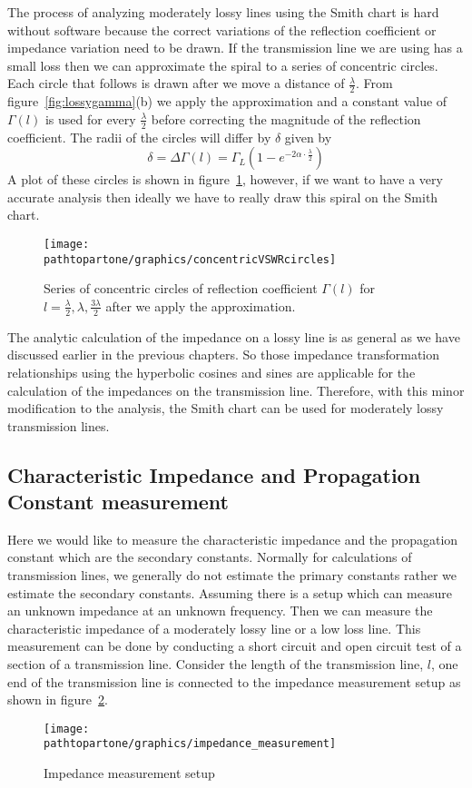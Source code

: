 The process of analyzing moderately lossy lines using the Smith chart is hard without software because the correct variations of the reflection coefficient or impedance variation need to be drawn. If the transmission line we are using has a small loss then we can approximate the spiral to a series of concentric circles. Each circle that follows is drawn after we move a distance of $\frac{\lambda}{2}$. From figure~\ref{fig:lossygamma}(b) we apply the approximation and a constant value of $\Gamma{(l)}$ is used for every $\frac{\lambda}{2}$ before correcting the magnitude of the reflection coefficient. The radii of the circles will differ by $\delta$ given by
\begin{dmath*}
\delta = \Delta \Gamma{(l)} = \Gamma_L(1 - e^{-2\alpha\cdot \frac{\lambda}{2}})
\end{dmath*}
A plot of these circles is shown in figure~\ref{fig:vswrlossy}, however, if we want to have a very accurate analysis then ideally we have to really draw this spiral on the Smith chart.
\begin{figure}[h]
\centering
\texttt{[image: \\pathtopartone/graphics/concentricVSWRcircles]}
\caption{Series of concentric circles of reflection coefficient $\Gamma{(l)}$ for $l = \frac{\lambda}{2},\lambda, \frac{3\lambda}{2}$ after we apply the approximation.}
\label{fig:vswrlossy}
\end{figure}

The analytic calculation of the impedance on a lossy line is as general as we have discussed earlier in the previous chapters. So those impedance transformation relationships using the hyperbolic cosines and sines are applicable for the calculation of the impedances on the transmission line. Therefore, with this minor modification to the analysis, the Smith chart can be used for moderately lossy transmission lines.

\subsection{Characteristic Impedance and Propagation Constant measurement}
Here we would like to measure the characteristic impedance and the propagation constant which are the secondary constants. Normally for calculations of transmission lines, we generally do not estimate the primary constants rather we estimate the secondary constants. Assuming there is a setup which can measure an unknown impedance at an unknown frequency. Then we can measure the characteristic impedance of a moderately lossy line or a low loss line. This measurement can be done by conducting a short circuit and open circuit test of a section of a transmission line. Consider the length of the transmission line, $l$, one end of the transmission line is connected to the impedance measurement setup as shown in figure~\ref{fig:impmeasurement}.
\begin{figure}[h]
\centering
\texttt{[image: \\pathtopartone/graphics/impedance\_measurement]}
\caption{Impedance measurement setup}
\label{fig:impmeasurement}
\end{figure}

